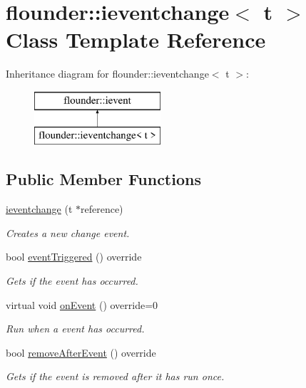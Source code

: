\hypertarget{classflounder_1_1ieventchange}{}\section{flounder\+:\+:ieventchange$<$ t $>$ Class Template Reference}
\label{classflounder_1_1ieventchange}
Inheritance diagram for flounder\+:\+:ieventchange$<$ t $>$\+:\begin{figure}[H]
\begin{center}
\leavevmode
\includegraphics[height=2.000000cm]{classflounder_1_1ieventchange}
\end{center}
\end{figure}
\subsection*{Public Member Functions}
\begin{DoxyCompactItemize}
\item 
\hyperlink{classflounder_1_1ieventchange_a7cf8556411393fc920080d5b88a8b6d1}{ieventchange} (t $\ast$reference)
\begin{DoxyCompactList}\small\item\em Creates a new change event. \end{DoxyCompactList}\item 
bool \hyperlink{classflounder_1_1ieventchange_a0119e298c97f8457db4024523c97c429}{event\+Triggered} () override
\begin{DoxyCompactList}\small\item\em Gets if the event has occurred. \end{DoxyCompactList}\item 
virtual void \hyperlink{classflounder_1_1ieventchange_ab4977a4a6c22b93e82ea294d0d906a9e}{on\+Event} () override=0
\begin{DoxyCompactList}\small\item\em Run when a event has occurred. \end{DoxyCompactList}\item 
bool \hyperlink{classflounder_1_1ieventchange_a6c7872d176004b7dfb4a01e90221976d}{remove\+After\+Event} () override
\begin{DoxyCompactList}\small\item\em Gets if the event is removed after it has run once. \end{DoxyCompactList}\end{DoxyCompactItemize}
